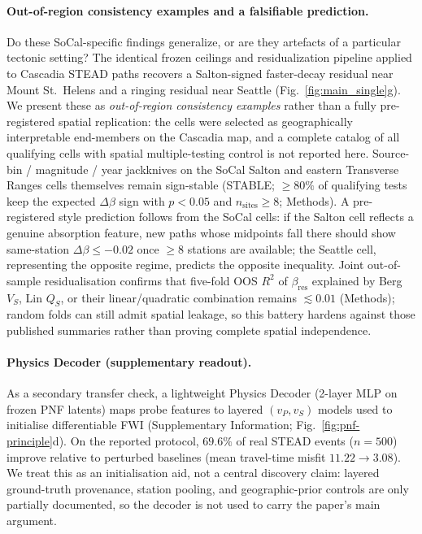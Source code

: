 \documentclass[twocolumn, 10pt]{article}
\newcommand{\pnf}{\textsc{PNF}}
\begin{document}
\paragraph{Out-of-region consistency examples and a falsifiable prediction.}
Do these SoCal-specific findings generalize, or are they artefacts of a particular tectonic setting? The identical frozen ceilings and residualization pipeline applied to Cascadia STEAD paths recovers a Salton-signed faster-decay residual near Mount St.~Helens and a ringing residual near Seattle (Fig.~\ref{fig:main_single}g). We present these as \emph{out-of-region consistency examples} rather than a fully pre-registered spatial replication: the cells were selected as geographically interpretable end-members on the Cascadia map, and a complete catalog of all qualifying cells with spatial multiple-testing control is not reported here. Source-bin / magnitude / year jackknives on the SoCal Salton and eastern Transverse Ranges cells themselves remain sign-stable (STABLE; \(\ge80\%\) of qualifying tests keep the expected \(\Delta\beta\) sign with \(p<0.05\) and \(n_{\mathrm{sites}}\ge8\); Methods). A pre-registered style prediction follows from the SoCal cells: if the Salton cell reflects a genuine absorption feature, new paths whose midpoints fall there should show same-station \(\Delta\beta\le-0.02\) once \(\ge8\) stations are available; the Seattle cell, representing the opposite regime, predicts the opposite inequality. Joint out-of-sample residualisation confirms that five-fold OOS \(R^{2}\) of \(\beta_{\mathrm{res}}\) explained by Berg \(V_S\), Lin \(Q_S\), or their linear/quadratic combination remains \(\lesssim0.01\) (Methods); random folds can still admit spatial leakage, so this battery hardens against those published summaries rather than proving complete spatial independence.


\paragraph{Physics Decoder (supplementary readout).}
As a secondary transfer check, a lightweight Physics Decoder (2-layer MLP on frozen \pnf{} latents) maps probe features to layered \((v_P,v_S)\) models used to initialise differentiable FWI (Supplementary Information; Fig.~\ref{fig:pnf-principle}d)\cite{tarantola1984,virieux2009,huang2023}. On the reported protocol, \(69.6\%\) of real STEAD events (\(n=500\)) improve relative to perturbed baselines (mean travel-time misfit \(11.22\to3.08\)). We treat this as an initialisation aid, not a central discovery claim: layered ground-truth provenance, station pooling, and geographic-prior controls are only partially documented, so the decoder is not used to carry the paper's main argument.
\end{document}
